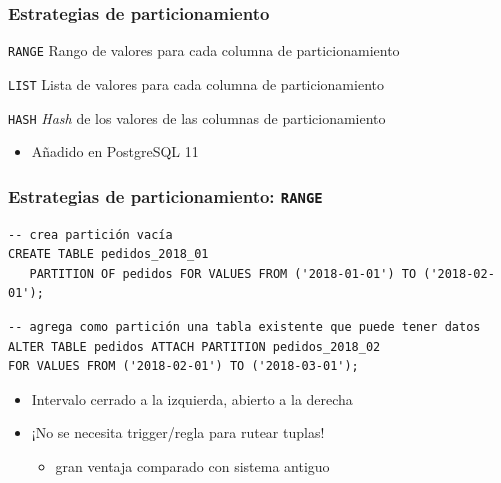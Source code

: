 \documentclass[ignorenonframetext,t]{beamer}
\begin{document}
\begin{frame}
    \frametitle{Estrategias de particionamiento}

\begin{description}
	\item{\texttt{RANGE}} Rango de valores para cada columna de particionamiento
	    \vskip 1cm

	\item{\texttt{LIST}} Lista de valores para cada columna de particionamiento
	    \vskip 1cm
\pause
	\item{\texttt{HASH}} \textit{Hash} de los valores de las columnas de particionamiento
	\begin{itemize} \item Añadido en PostgreSQL 11\end{itemize}
\end{description}
\end{frame}

\begin{frame}[fragile]
	\frametitle{Estrategias de particionamiento: \texttt{RANGE}}
\begin{lstlisting}
-- crea partición vacía
CREATE TABLE pedidos_2018_01
   PARTITION OF pedidos FOR VALUES FROM ('2018-01-01') TO ('2018-02-01');
\end{lstlisting}
\pause
\begin{lstlisting}
-- agrega como partición una tabla existente que puede tener datos
ALTER TABLE pedidos ATTACH PARTITION pedidos_2018_02
FOR VALUES FROM ('2018-02-01') TO ('2018-03-01');
\end{lstlisting}
\pause
\begin{itemize}
	\item Intervalo cerrado a la izquierda, abierto a la derecha
\end{itemize}

\pause
\begin{itemize}
	\item ¡No se necesita trigger/regla para rutear tuplas!
	\begin{itemize} \item gran ventaja comparado con sistema antiguo \end{itemize}
\end{itemize}
\end{frame}
\end{document}
